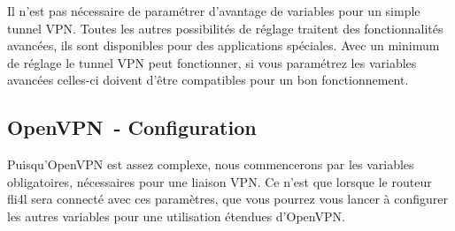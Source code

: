   Il n'est pas nécessaire de paramétrer d'avantage de variables pour un simple tunnel VPN.
  Toutes les autres possibilités de réglage traitent des fonctionnalités avancées, ils sont
  disponibles pour des applications spéciales. Avec un minimum de réglage le tunnel VPN
  peut fonctionner, si vous paramétrez les variables avancées celles-ci doivent d'être
  compatibles pour un bon fonctionnement.


\subsection{OpenVPN~- Configuration}

  Puisqu'OpenVPN est assez complexe, nous commencerons par les variables obligatoires,
  nécessaires pour une liaison VPN. Ce n'est que lorsque le routeur fli4l sera connecté
  avec ces paramètres, que vous pourrez vous lancer à configurer les autres variables pour
  une utilisation étendues d'OpenVPN.

